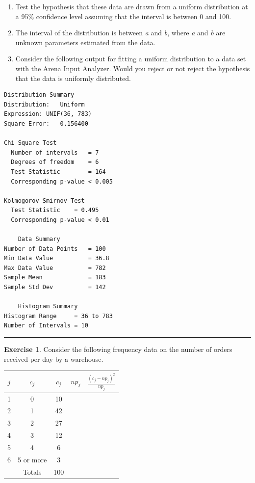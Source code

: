 \documentclass[
]{book}
\theoremstyle{definition}
\theoremstyle{definition}
\theoremstyle{definition}
\newtheorem{exercise}{Exercise}[chapter]
\theoremstyle{definition}
\theoremstyle{remark}
\begin{document}
\begin{enumerate}
\def\labelenumi{\alph{enumi}.}
\item
  Test the hypothesis that these data are drawn from a uniform
  distribution at a 95\% confidence level assuming that the interval is between 0 and 100.
\item
  The interval of the distribution is between \emph{a} and \emph{b}, where \emph{a} and
  \emph{b} are unknown parameters estimated from the data.
\item
  Consider the following output for fitting a uniform distribution to a
  data set with the Arena Input Analyzer. Would you reject or not reject
  the hypothesis that the data is uniformly distributed.
\end{enumerate}

\begin{verbatim}
Distribution Summary
Distribution:   Uniform      
Expression: UNIF(36, 783)
Square Error:   0.156400

Chi Square Test
  Number of intervals   = 7
  Degrees of freedom    = 6
  Test Statistic        = 164
  Corresponding p-value < 0.005

Kolmogorov-Smirnov Test
  Test Statistic    = 0.495
  Corresponding p-value < 0.01

    Data Summary
Number of Data Points   = 100
Min Data Value          = 36.8
Max Data Value          = 782
Sample Mean             = 183
Sample Std Dev          = 142

    Histogram Summary
Histogram Range     = 36 to 783
Number of Intervals = 10
\end{verbatim}

\begin{center}\rule{0.5\linewidth}{0.5pt}\end{center}

\begin{exercise}
\protect\hypertarget{exr:AppDistFitP9}{}{\label{exr:AppDistFitP9} }Consider the following frequency data
on the number of orders received per day by a warehouse.
\end{exercise}

\begin{longtable}[]{@{}ccccc@{}}
\toprule
\(j\) & \(c_j\) & \(c_j\) & \(np_j\) & \(\frac{(c_j - np_j)^2}{np_j}\) \\
\midrule
\endhead
1 & 0 & 10 & & \\
2 & 1 & 42 & & \\
3 & 2 & 27 & & \\
4 & 3 & 12 & & \\
5 & 4 & 6 & & \\
6 & 5 or more & 3 & & \\
& Totals & 100 & & \\
\bottomrule
\end{longtable}
\end{document}

